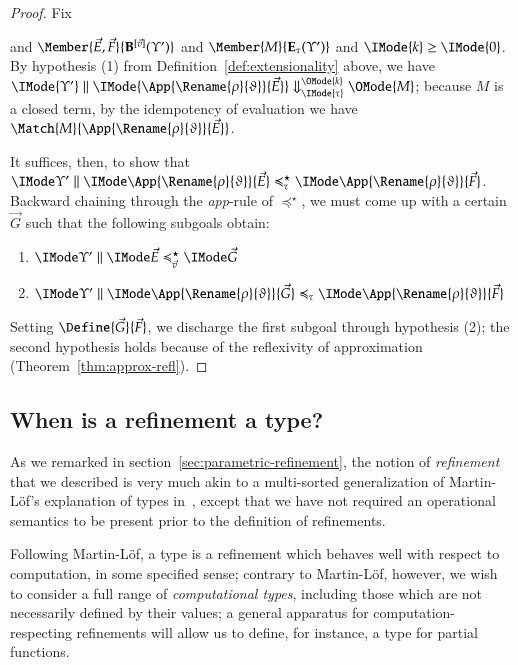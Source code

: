 \documentclass[11pt]{article}
\theoremstyle{definition}
\theoremstyle{notation}
\theoremstyle{remark}
\numberwithin{equation}{section}
\newcommand\EvalN[5]{\IMode{#1}\parallel\IMode{#4}\Downarrow^{\OMode{#3}}_{\IMode{#2}}\OMode{#5}}
\newcommand\Exprs{\mathbf{E}}
\newcommand\BExprs{\mathbf{B}}
\begin{document}
\begin{proof}
  Fix
  and $\Member{\vec{E},\vec{F}}{\BExprs^{[\vec{v}]}(\Upsilon')}$ and
  $\Member{M}{\Exprs_\tau(\Upsilon')}$ and $\IMode{k}\geq\IMode{0}$.
  By hypothesis (1) from Definition~\ref{def:extensionality} above, we have
  $\EvalN{\Upsilon'}{\tau}{k}{\App{\Rename{\rho}{\vartheta}}{\vec{E}}}{M}$;
  because $M$ is a closed term, by the idempotency of evaluation we have
  $\Match{M}{\App{\Rename{\rho}{\vartheta}}{\vec{E}}}$.

  It suffices, then, to show that
  $\PBinRel{\preccurlyeq^\star_\tau}{\Upsilon'}{\App{\Rename{\rho}{\vartheta}}{\vec{E}}}{\App{\Rename{\rho}{\vartheta}}{\vec{F}}}$.
  Backward chaining through the \textit{app}-rule of $\preccurlyeq^\star$, we must
  come up with a certain $\vec{G}$ such that the following subgoals obtain:
  \begin{enumerate}
    \item $\PBinRel{\preccurlyeq^\star_{\vec{v}}}{\Upsilon'}{\vec{E}}{\vec{G}}$
    \item $\PBinRel{\preccurlyeq_\tau}{\Upsilon'}{\App{\Rename{\rho}{\vartheta}}{\vec{G}}}{\App{\Rename{\rho}{\vartheta}}{\vec{F}}}$
  \end{enumerate}

  Setting $\Define{\vec{G}}{\vec{F}}$, we discharge the first subgoal through
  hypothesis (2); the second hypothesis holds because of the reflexivity of
  approximation (Theorem~\ref{thm:approx-refl}).

\end{proof}

\subsection{When is a refinement a type?}

As we remarked in section~\ref{sec:parametric-refinement}, the notion of
\emph{refinement} that we described is very much akin to a multi-sorted
generalization of Martin-L\"of's explanation of types
in~\cite{martin-lof:1979}, except that we have not required an operational
semantics to be present prior to the definition of refinements.

Following Martin-L\"of, a type is a refinement which behaves well with respect
to computation, in some specified sense; contrary to Martin-L\"of, however, we wish to
consider a full range of \emph{computational types}, including those which are
not necessarily defined by their values; a general apparatus for
computation-respecting refinements will allow us to define, for instance, a
type for partial functions.
\end{document}
